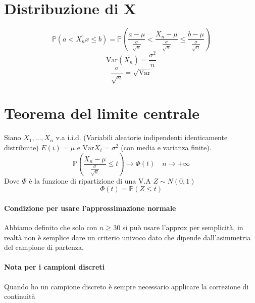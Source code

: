 \documentclass[12pt, a4paper, openany]{book}
\begin{document}
\section{Distribuzione di X}
\begin{equation*}
    \mathbb{P} (a  < \bar{X_nx} \leq b) = \mathbb{P} (\frac{a - \mu}{\frac{\sigma}{\sqrt{n}}} 
    < \frac{X_n - \mu}{\frac{\sigma}{\sqrt{n}}} \leq \frac{b - \mu}{\frac{\sigma}{\sqrt{n}}})   
\end{equation*}
\begin{equation*}
    \text{Var}(\bar{X_n}) = \frac{\sigma ^ 2}{n} 
\end{equation*}
\begin{equation*}
    \frac{\sigma}{\sqrt{n}} = \sqrt{\text{Var}}
\end{equation*}

\section{Teorema del limite centrale}
Siano $X_1, ..., X_n$ v.a i.i.d. (Variabili aleatorie indipendenti identicamente distribuite)
$E(i) = \mu$ e $\text{Var}X_i = \sigma^2$ (con media e varianza finite).
\begin{equation*}
    \mathbb{P} (\frac{X_n-\mu}{\frac{\sigma}{\sqrt{n}}} \leq t) \rightarrow \Phi (t) \quad n \rightarrow + \infty   
\end{equation*}
Dove $\Phi$ è la funzione di ripartizione di una V.A $Z\sim N(0,1)$
\begin{equation*}
    \Phi(t) = \mathbb{P}(Z \leq t)
\end{equation*}
\paragraph*{Condizione per usare l'approssimazione normale} Abbiamo definito 
che solo con $n \geq 30$ si può usare l'approx per semplicità, in realtà non è semplice
dare un criterio univoco dato che dipende dall'asimmetria del campione di partenza.
\paragraph*{Nota per i campioni discreti} Quando ho un campione discreto è sempre necessario
applicare la correzione di continuità 
\end{document}
